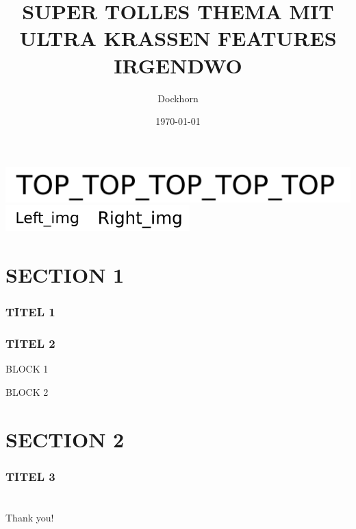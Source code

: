 \documentclass[11pt,aspectratio=169,handout]{beamer}%
\title{
\textcolor{cl1}{\Huge SUPER TOLLES THEMA}\newline
\textcolor{cl1!50}{\normalsize MIT ULTRA KRASSEN FEATURES}\newline
\textcolor{cl1!50}{\tiny IRGENDWO}
}
\author{\tiny Dockhorn}
\date{\vspace*{-0.5cm}\tiny\today{}}
\begin{document}
\begin{frame}
\vspace{-1cm}
\includegraphics[width=\textwidth]{logo/top.png}\\\vspace{1cm}
\includegraphics[height=1cm]{logo/left.png}\hfill\includegraphics[height=1cm]{logo/right.png}\hspace{0.2cm}
\maketitle
\thispagestyle{empty}
\end{frame}
\section{SECTION 1}
\begin{frame}
\frametitle{TITEL 1}

\end{frame}
\begin{frame}
\frametitle{TITEL 2}
\begin{block}{BLOCK 1}

\end{block}
\begin{block}{BLOCK 2}

\end{block}
\end{frame}
\section{SECTION 2}
\begin{frame}
\frametitle{TITEL 3}

\end{frame}
\section{}
\begin{frame}
\begin{center}
{\Huge { \textcolor{cl1}{Thank you!}}}
\end{center}
\end{frame}
\end{document}
